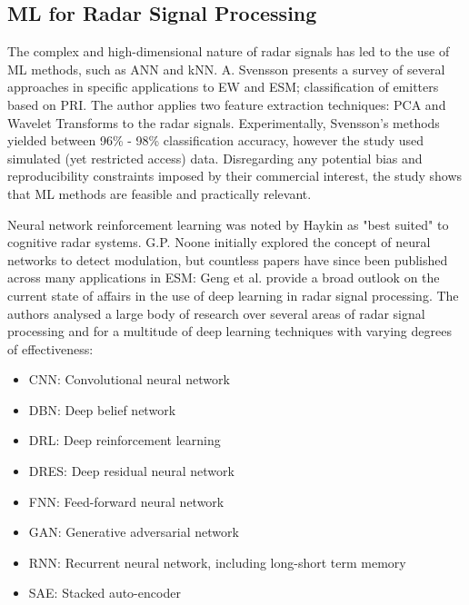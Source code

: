 \subsection{ML for Radar Signal Processing}
The complex and high-dimensional nature of radar signals has led to the use of \ac{ML} methods, such as \ac{ANN} and \ac{kNN}. 
A. Svensson \cite{svensson_classification_2022} presents a survey of several approaches in specific applications to \ac{EW} and \ac{ESM}; classification of emitters based on \ac{PRI}.
The author applies two feature extraction techniques: \ac{PCA} and Wavelet Transforms to the radar signals.
Experimentally, Svensson's methods yielded between 96\% - 98\% classification accuracy, however the study used simulated (yet restricted access) data. 
Disregarding any potential bias and reproducibility constraints imposed by their commercial interest, the study shows that \ac{ML} methods are feasible and practically relevant.


Neural network reinforcement learning was noted by Haykin \cite{haykin_cognitive_2006} as "best suited" to cognitive radar systems.
G.P. Noone \cite{noone_neural_1999} initially explored the concept of neural networks to detect modulation, but countless papers have since been published across many applications in \ac{ESM}:
Geng et al. \cite{geng_deep-learning_2021} provide a broad outlook on the current state of affairs in the use of deep learning in radar signal processing.
The authors analysed a large body of research over several areas of radar signal processing and for a multitude of deep learning techniques with varying degrees of effectiveness:
\begin{itemize}
 \item CNN: Convolutional neural network
 \item DBN: Deep belief network
 \item DRL: Deep reinforcement learning
 \item DRES: Deep residual neural network
 \item FNN: Feed-forward neural network
 \item GAN: Generative adversarial network
 \item RNN: Recurrent neural network, including long-short term memory
 \item SAE: Stacked auto-encoder
\end{itemize}


